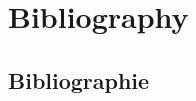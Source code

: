 \documentclass[fontsize=9pt]{scrbook}
\begin{document}
  

  \chapter*{Bibliography}
  \printbibliography[heading=none]

\else

  \mainmatter

  
  

  \begin{otherlanguage}{french}
  \chapter*{Bibliographie}
  \printbibliography[heading=none]
  \end{otherlanguage}

\fi

\ifThesisArtCover
  \clearpage
  \thispagestyle{empty}
  \mbox{}
  \clearpage
  \ifodd\ReadonlyShipoutCounter\else
    \thispagestyle{empty}\null\clearpage
  \fi

  
\fi
\end{document}
